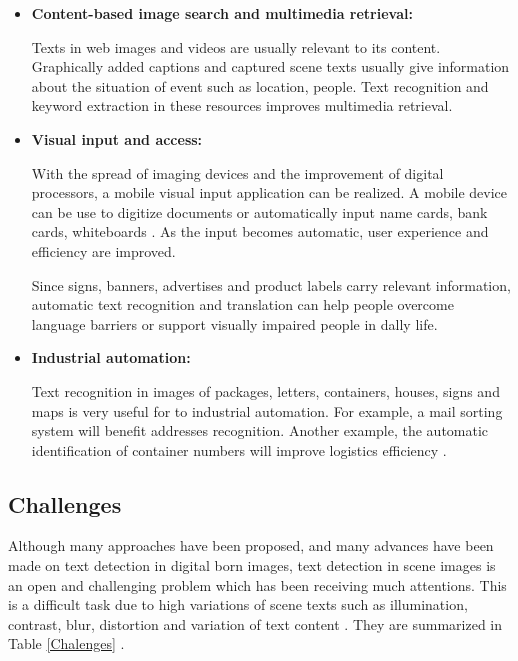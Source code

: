 \begin{itemize}
\item{\textbf{Content-based image search and multimedia retrieval:}}

Texts in web images and videos are usually relevant to its content. Graphically added captions and captured scene texts usually give information about the situation of event such as location, people. Text recognition and keyword extraction in these resources improves multimedia retrieval. 

\item{\textbf{Visual input and access:}}

With the spread of imaging devices and the improvement of digital processors, a mobile visual input application can be realized. A mobile device can be use to digitize documents or automatically input name cards, bank cards, whiteboards \cite{Liang.2005.IJDAR}. As the input becomes automatic, user experience and efficiency are improved. 

Since signs, banners, advertises and product labels carry relevant information, automatic text recognition and translation can help people overcome language barriers or support visually impaired people in dally life. 

\item{\textbf{Industrial automation:}}

Text recognition in images of packages, letters, containers, houses, signs and maps is very useful for to industrial automation. For example, a mail sorting system will benefit addresses recognition. Another example, the automatic identification of container numbers will improve logistics efficiency \cite{He.2005.TITS}.

\end{itemize}

\subsection{Challenges}

Although many approaches have been proposed, and many advances have been made on text detection in digital born images, text detection in scene images is an open and challenging problem which has been receiving much attentions. This is a difficult task due to high variations of scene texts such as illumination, contrast, blur, distortion and variation of text content \cite{Liang.2005.IJDAR}. They are summarized in Table \ref{Chalenges}  .

